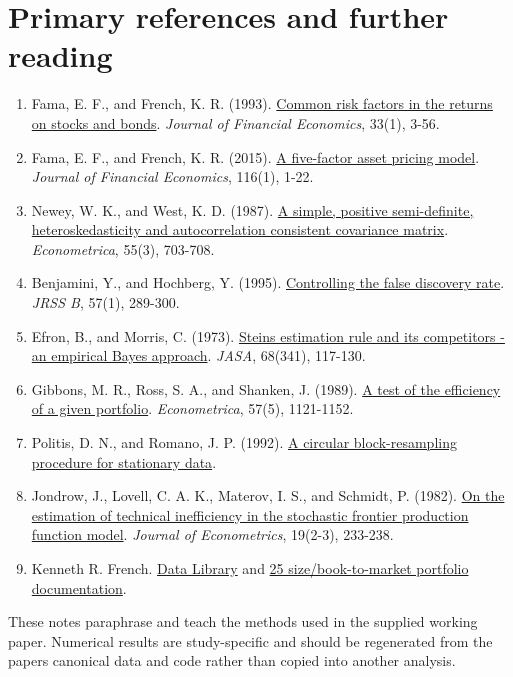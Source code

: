 \hypertarget{references}{}
\hypertarget{primary-references-and-further-reading}{%
\chapter{Primary references and further
reading}\label{primary-references-and-further-reading}}

\begin{enumerate}
\tightlist
\item
  Fama, E. F., and French, K. R. (1993).
  \href{https://www.sciencedirect.com/science/article/pii/0304405X93900235}{Common
  risk factors in the returns on stocks and bonds}. \emph{Journal of
  Financial Economics}, 33(1), 3-56.
\item
  Fama, E. F., and French, K. R. (2015).
  \href{https://www.sciencedirect.com/science/article/pii/S0304405X14002323}{A
  five-factor asset pricing model}. \emph{Journal of Financial
  Economics}, 116(1), 1-22.
\item
  Newey, W. K., and West, K. D. (1987).
  \href{https://www.jstor.org/stable/1913610}{A simple, positive
  semi-definite, heteroskedasticity and autocorrelation consistent
  covariance matrix}. \emph{Econometrica}, 55(3), 703-708.
\item
  Benjamini, Y., and Hochberg, Y. (1995).
  \href{https://rss.onlinelibrary.wiley.com/doi/10.1111/j.2517-6161.1995.tb02031.x}{Controlling
  the false discovery rate}. \emph{JRSS B}, 57(1), 289-300.
\item
  Efron, B., and Morris, C. (1973).
  \href{https://statistics.stanford.edu/technical-reports/steins-estimation-rule-and-its-competitors-empirical-bayes-approach}{Stein\textquotesingle s
  estimation rule and its competitors - an empirical Bayes approach}.
  \emph{JASA}, 68(341), 117-130.
\item
  Gibbons, M. R., Ross, S. A., and Shanken, J. (1989).
  \href{https://www.jstor.org/stable/1913625}{A test of the efficiency
  of a given portfolio}. \emph{Econometrica}, 57(5), 1121-1152.
\item
  Politis, D. N., and Romano, J. P. (1992).
  \href{https://statistics.stanford.edu/technical-reports/circular-block-resampling-procedure-stationary-data}{A
  circular block-resampling procedure for stationary data}.
\item
  Jondrow, J., Lovell, C. A. K., Materov, I. S., and Schmidt, P. (1982).
  \href{https://www.sciencedirect.com/science/article/pii/0304407682900045}{On
  the estimation of technical inefficiency in the stochastic frontier
  production function model}. \emph{Journal of Econometrics}, 19(2-3),
  233-238.
\item
  Kenneth R. French.
  \href{https://mba.tuck.dartmouth.edu/pages/faculty/ken.french/data_library.html}{Data
  Library} and
  \href{https://mba.tuck.dartmouth.edu/pages/faculty/ken.french/data_library/tw_5_ports.html}{25
  size/book-to-market portfolio documentation}.
\end{enumerate}

These notes paraphrase and teach the methods used in the supplied
working paper. Numerical results are study-specific and should be
regenerated from the paper\textquotesingle s canonical data and code
rather than copied into another analysis.

